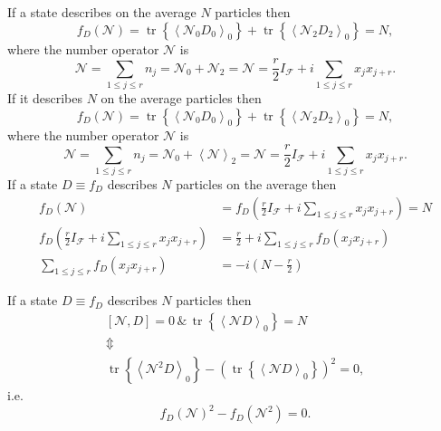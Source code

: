 \documentclass[aps,preprint]{revtex4}%
\begin{document}
If a state describes on the average $N$ particles then%
\begin{equation}
f_{D}\left(  \mathcal{N}\right)  =\operatorname*{tr}\left\{  \left\langle
\mathcal{N}_{0}D_{0}\right\rangle _{0}\right\}  +\operatorname*{tr}\left\{
\left\langle \mathcal{N}_{2}D_{2}\right\rangle _{0}\right\}  =N,
\end{equation}
where the number operator $\mathcal{N}$ is
\begin{equation}
\mathcal{N}=\sum_{1\leq j\leq r}n_{j}=\mathcal{N}_{0}+\mathcal{N}%
_{2}=\mathcal{N}=\frac{r}{2}I_{\mathcal{F}}+i\sum_{1\leq j\leq r}x_{j}x_{j+r}.
\end{equation}
If it describes $N$ on the average particles then
\begin{equation}
f_{D}\left(  \mathcal{N}\right)  =\operatorname*{tr}\left\{  \left\langle
\mathcal{N}_{0}D_{0}\right\rangle _{0}\right\}  +\operatorname*{tr}\left\{
\left\langle \mathcal{N}_{2}D_{2}\right\rangle _{0}\right\}  =N,
\end{equation}
where the number operator $\mathcal{N}$ is
\begin{equation}
\mathcal{N}=\sum_{1\leq j\leq r}n_{j}=\mathcal{N}_{0}+\left\langle
\mathcal{N}\right\rangle _{2}=\mathcal{N}=\frac{r}{2}I_{\mathcal{F}}%
+i\sum_{1\leq j\leq r}x_{j}x_{j+r}.
\end{equation}
If a state $D\equiv f_{D}$ describes $N$ particles on the average then
\begin{align}
f_{D}\left(  \mathcal{N}\right)   &  =f_{D}\left(  \frac{r}{2}I_{\mathcal{F}%
}+i\sum_{1\leq j\leq r}x_{j}x_{j+r}\right)  =N\\
f_{D}\left(  \frac{r}{2}I_{\mathcal{F}}+i\sum_{1\leq j\leq r}x_{j}%
x_{j+r}\right)   &  =\frac{r}{2}+i\sum_{1\leq j\leq r}f_{D}\left(
x_{j}x_{j+r}\right) \\
\sum_{1\leq j\leq r}f_{D}\left(  x_{j}x_{j+r}\right)   &  =-i\left(
N-\frac{r}{2}\right)
\end{align}


If a state $D\equiv f_{D}$ describes $N$ particles then
\begin{gather}
\left[  \mathcal{N},D\right]  =0\,\&\,\operatorname*{tr}\left\{  \left\langle
\mathcal{N}D\right\rangle _{0}\right\}  =N\nonumber\\
\Updownarrow\nonumber\\
\operatorname*{tr}\left\{  \left\langle \mathcal{N}^{2}D\right\rangle
_{0}\right\}  -\left(  \operatorname*{tr}\left\{  \left\langle \mathcal{N}%
D\right\rangle _{0}\right\}  \right)  ^{2}=0,
\end{gather}
i.e.
\begin{equation}
f_{D}\left(  \mathcal{N}\right)  ^{2}-f_{D}\left(  \mathcal{N}^{2}\right)  =0.
\end{equation}
\end{document}
